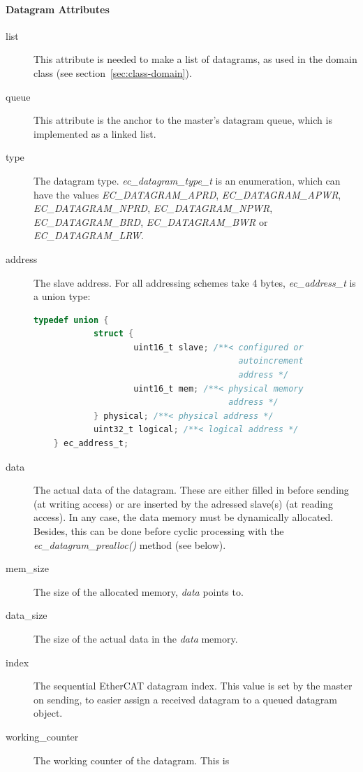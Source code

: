 \documentclass[a4paper,12pt,BCOR6mm,bibtotoc,idxtotoc]{scrbook}
\begin{document}
\paragraph{Datagram Attributes}

\begin{description}
\item[list] This attribute is needed to make a list of datagrams, as
  used in the domain class (see section~\ref{sec:class-domain}).
\item[queue] This attribute is the anchor to the master's datagram
  queue, which is implemented as a linked list.
\item[type] The datagram type. \textit{ec\_\-datagram\_\-type\_\-t} is
  an enumeration, which can have the values
  \textit{EC\_\-DATAGRAM\_\-APRD}, \textit{EC\_\-DATAGRAM\_\-APWR},
  \textit{EC\_\-DATAGRAM\_\-NPRD}, \textit{EC\_\-DATAGRAM\_\-NPWR},
  \textit{EC\_\-DATAGRAM\_\-BRD}, \textit{EC\_\-DATAGRAM\_\-BWR} or
  \textit{EC\_\-DATAGRAM\_\-LRW}.
\item[address] The slave address. For all addressing schemes take 4
  bytes, \textit{ec\_address\_t} is a union type:
  \begin{lstlisting}[gobble=4,language=C]
    typedef union {
            struct {
                    uint16_t slave; /**< configured or
                                         autoincrement
                                         address */
                    uint16_t mem; /**< physical memory
                                       address */
            } physical; /**< physical address */
            uint32_t logical; /**< logical address */
    } ec_address_t;
  \end{lstlisting}
\item[data] The actual data of the datagram. These are either filled
  in before sending (at writing access) or are inserted by the
  adressed slave(s) (at reading access). In any case, the data memory
  must be dynamically allocated. Besides, this can be done before
  cyclic processing with the \textit{ec\_datagram\_prealloc()} method
  (see below).
\item[mem\_size] The size of the allocated memory, \textit{data}
  points to.
\item[data\_size] The size of the actual data in the \textit{data}
  memory.
\item[index] The sequential EtherCAT datagram index. This value is set
  by the master on sending, to easier assign a received datagram to a
  queued datagram object.
\item[working\_counter] The working counter of the datagram. This is

\end{description}
\end{document}
